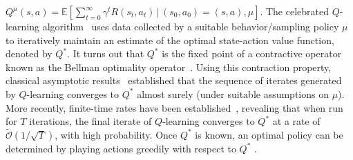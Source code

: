 \documentclass{article}
\newcommand{\mc}{\mathcal}
\begin{document}
$Q^\mu(s,a) = \mathbb{E}\left[ \sum_{t=0}^\infty \gamma^t R(s_t,a_t) \,\bigg|\, (s_0, a_0) = (s, a), \mu \right]$. The celebrated $Q$-learning algorithm~\cite{watkins1992q} uses data collected by a suitable behavior/sampling policy $\mu$ to iteratively maintain an estimate of the optimal state-action value function, denoted by $Q^*$. It turns out that $Q^*$ is the fixed point of a contractive operator known as the Bellman optimality operator~\cite{sutton1988}. Using this contraction property, classical asymptotic results~\cite{tsitsiklis94, jaakkola} established that the sequence of iterates generated by \(Q\)-learning converges to $Q^*$ almost surely (under suitable assumptions on $\mu$). More recently, finite-time rates have been established~\cite{wainwright, Qu, li2024q}, revealing that when run for $T$ iterations, the final iterate of $Q$-learning converges to $Q^*$ at a rate of $\widetilde{\mc{O}}(1/\sqrt{T})$, with high probability. Once $Q^*$ is known, an optimal policy can be determined by playing actions greedily with respect to $Q^*$ \cite{suttonRL}.  
\end{document}
